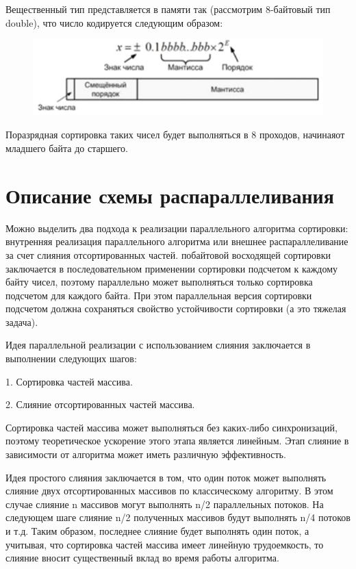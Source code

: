 \documentclass{report}
\begin{document}
Вещественный тип представляется в памяти так (рассмотрим 8-байтовый тип double), что число кодируется следующим образом: 

\begin{figure}[htp]
    \centering
    \includegraphics[width=14cm]{image8}
    \label{fig:galaxy}
\end{figure}
Поразрядная сортировка таких чисел будет выполняться в 8 проходов, начинаяот младшего байта до старшего.


\newpage

\section*{Описание схемы распараллеливания}

\par Можно выделить два подхода к реализации параллельного алгоритма сортировки: внутренняя реализация параллельного алгоритма или внешнее распараллеливание за счет слияния отсортированных частей.
 побайтовой восходящей сортировки заключается в последовательном применении сортировки подсчетом к каждому байту чисел, поэтому параллельно может выполняться только сортировка подсчетом для каждого байта. При этом параллельная версия сортировки подсчетом должна сохраняться свойство устойчивости сортировки (а это тяжелая задача).
\par Идея параллельной реализации с использованием слияния заключается в выполнении следующих шагов:

1. Сортировка частей массива.
\par2. Слияние отсортированных частей массива.

\par Сортировка частей массива может выполняться без каких-либо синхронизаций, поэтому теоретическое ускорение этого этапа является линейным. Этап слияние в зависимости от алгоритма может иметь различную эффективность.

\par Идея простого слияния заключается в том, что один поток может выполнять слияние двух отсортированных массивов по классическому алгоритму. В этом случае слияние n массивов могут выполнять n/2 параллельных потоков. На следующем шаге слияние n/2 полученных массивов будут выполнять n/4 потоков и т.д. Таким образом, последнее слияние будет выполнять один поток, а учитывая, что сортировка частей массива имеет линейную трудоемкость, то слияние вносит существенный вклад во время работы алгоритма.
\end{document}
